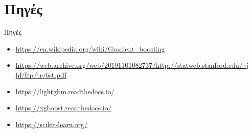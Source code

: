 \documentclass{beamer}
\begin{document}
\section{Πηγές}
\begin{frame}{Πηγές}
\begin{itemize}
    \item   \url{https://en.wikipedia.org/wiki/Gradient_boosting}
    \item  \url{https://web.archive.org/web/20191101082737/http://statweb.stanford.edu/~jhf/ftp/trebst.pdf}
    \item \url{https://lightgbm.readthedocs.io/}
    \item \url{https://xgboost.readthedocs.io/}
    \item  \url{https://scikit-learn.org/}
\end{itemize}

  
    
\end{frame}
\end{document}
